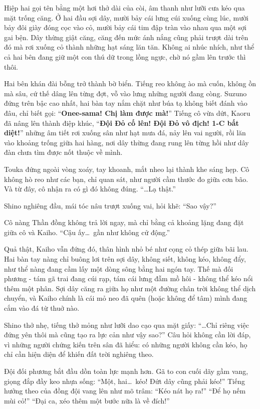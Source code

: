 \documentclass[../main.tex]{subfiles}
\begin{document}
Hiệp hai gọi tên bằng một hơi thở dài của còi, âm thanh như lưỡi cưa kéo qua mặt trống căng. Ở hai đầu sợi dây, mười bảy cái lưng cúi xuống cùng lúc, mười bảy đôi giày đóng cọc vào cỏ, mười bảy cái tim đập tràn vào nhau qua một sợi gai bện. Dây thừng giật căng, căng đến mức ánh nắng cũng phải trượt dài trên đó mà rơi xuống cỏ thành những hạt sáng lăn tăn. Không ai nhúc nhích, như thể cả hai bên đang giữ một con thú dữ trong lồng ngực, chờ nó gầm lên trước thì thôi.

Hai bên khán đài bỗng trở thành bờ biển. Tiếng reo không ào mà cuốn, không ồn mà sâu, cứ thế dâng lên từng đợt, vỗ vào lưng những người đang còng. Suzuno đứng trên bậc cao nhất, hai bàn tay nắm chặt như búa tạ không biết đánh vào đâu, chỉ biết gọi: ``\textbf{Onee-sama! Chị làm được mà!}'' Tiếng cô vừa dứt, Kaoru đã nâng lên thành điệp khúc, ``\textbf{Đội Đỏ cố lên! Đội Đỏ vô địch! 1-C bất diệt!}'' những âm tiết rơi xuống sân như hạt mưa đá, nảy lên vai người, rồi lăn vào khoảng trống giữa hai hàng, nơi dây thừng đang rung lên từng hồi như dây đàn chưa tìm được nốt thuộc về mình.

Touka đứng ngoài vòng xoáy, tay khoanh, mắt nheo lại thành khe sáng hẹp. Cô không hò reo như các bạn, chỉ quan sát, như người cầm thước đo giữa cơn bão. Và từ đây, cô nhận ra có gì đó không đúng. ``\dots Lạ thật.''

Shino nghiêng đầu, mái tóc nâu trượt xuống vai, hỏi khẽ: ``Sao vậy?''

Cô nàng Thần đồng không trả lời ngay, mà chỉ bằng cả khoảng lặng đang đặt giữa cô và Kaiho. ``Cậu ấy\dots\ gần như không cử động.''

Quả thật, Kaiho vẫn đứng đó, thân hình nhỏ bé như cọng cỏ thép giữa bãi lau. Hai bàn tay nàng chỉ buông lơi trên sợi dây, không siết, không kéo, không đẩy, như thể nàng đang cầm lấy một dòng sông bằng hai ngón tay. Thế mà đối phương - tám gã trai đang cúi rạp, tám cái lưng đẫm mồ hôi - không thể kéo nổi thêm một phân. Sợi dây căng ra giữa họ như một đường chân trời không thể dịch chuyển, và Kaiho chính là cái mỏ neo đã quên (hoặc không để tâm) mình đang cắm vào đá từ thuở nào.

Shino thở nhẹ, tiếng thở mỏng như lưỡi dao cạo qua mặt giấy: ``\dots Chỉ riêng việc đứng yên thôi mà cũng tạo ra lực cản như vậy sao?'' Câu hỏi không cần lời đáp, vì những người chứng kiến trên sân đã hiểu: có những người không cần kéo, họ chỉ cần hiện diện để khiến đất trời nghiêng theo.

Đội đối phương bắt đầu dồn toàn lực mạnh hơn. Gã to con cuối dãy gầm vang, giọng đắp đầy keo nhựa sống: ``Một, hai\dots\ kéo! Đứt dây cũng phải kéo!''  Tiếng hưởng theo của đồng đội vang lên như mõ trâm: ``Kéo nát họ ra!'' ``Để họ nếm mùi cỏ!'' ``Đại ca, xéo thêm một bước nữa là về đích!''
\end{document}
